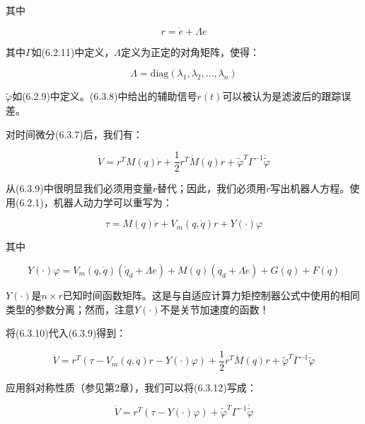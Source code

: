 \documentclass[12pt,a4paper]{ctexart}
\begin{document}
其中

\begin{equation}\label{eq:r-def}
r = \dot{e} + \Lambda e
\end{equation}

其中$\Gamma$如(6.2.11)中定义，$\Lambda$定义为正定的对角矩阵，使得：

\begin{equation}
\Lambda = \text{diag}(\lambda_1, \lambda_2, \ldots, \lambda_n)
\end{equation}

$\tilde{\varphi}$如(6.2.9)中定义。(6.3.8)中给出的辅助信号$r(t)$可以被认为是滤波后的跟踪误差。

对时间微分(6.3.7)后，我们有：

\begin{equation}\label{eq:v-deriv}
\dot{V} = r^T M(q)\dot{r} + \frac{1}{2}r^T \dot{M}(q)r + \tilde{\varphi}^T \Gamma^{-1} \dot{\tilde{\varphi}}
\end{equation}

从(6.3.9)中很明显我们必须用变量$r$替代；因此，我们必须用$r$写出机器人方程。使用(6.2.1)，机器人动力学可以重写为：

\begin{equation}\label{eq:robot-r}
\tau = M(q)\dot{r} + V_m(q, \dot{q})r + Y(\cdot)\varphi
\end{equation}

其中

\begin{equation}\label{eq:Y-def}
Y(\cdot)\varphi = V_m(q, \dot{q})(\dot{q}_d + \Lambda e) + M(q)(\ddot{q}_d + \Lambda \dot{e}) + G(q) + F(\dot{q})
\end{equation}

$Y(\cdot)$是$n \times r$已知时间函数矩阵。这是与自适应计算力矩控制器公式中使用的相同类型的参数分离；然而，注意$Y(\cdot)$不是关节加速度的函数！

将(6.3.10)代入(6.3.9)得到：

\begin{equation}\label{eq:v-subst}
\dot{V} = r^T (\tau - V_m(q, \dot{q})r - Y(\cdot)\varphi) + \frac{1}{2}r^T \dot{M}(q)r + \tilde{\varphi}^T \Gamma^{-1} \dot{\tilde{\varphi}}
\end{equation}

应用斜对称性质（参见第2章），我们可以将(6.3.12)写成：

\begin{equation}\label{eq:v-skew}
\dot{V} = r^T (\tau - Y(\cdot)\varphi) + \tilde{\varphi}^T \Gamma^{-1} \dot{\tilde{\varphi}}
\end{equation}
\end{document}
